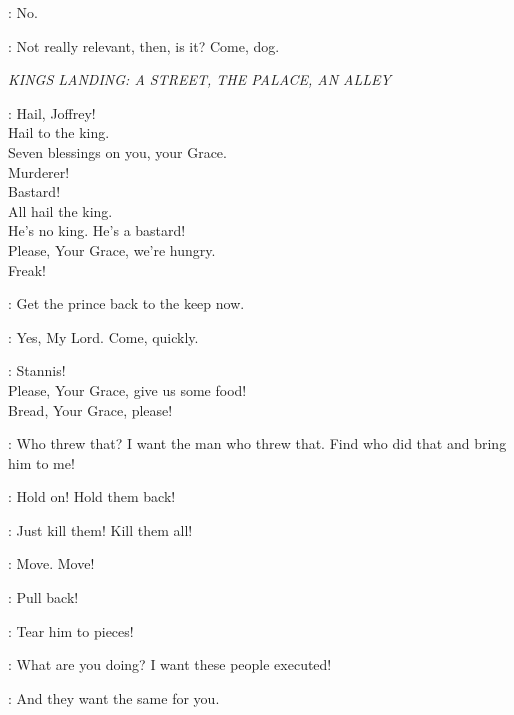 \SANSA: No. 

\JOFFREY: Not really relevant, then, is it?  Come, dog. 


\scene

\textit{KINGS LANDING: A STREET, THE PALACE, AN ALLEY} 


\CROWD: Hail, Joffrey!\\ 
Hail to the king.\\
Seven blessings on you, your Grace.\\
Murderer!\\
Bastard!\\
All hail the king.\\
He's no king. He's a bastard!\\
Please, Your Grace, we're hungry.\\
Freak!

\TYRION: Get the prince  back to the keep now. 

\LANNISTERGUARD: Yes, My Lord. Come, quickly. 

\CROWD: Stannis!\\
Please, Your Grace, give us some food!\\
Bread, Your Grace, please!


\JOFFREY: Who threw that? I want the man who threw that. Find who did that and bring him to me! 


\GUARD: Hold on! Hold them back! 

\JOFFREY: Just kill them! Kill them all! 


\TYRION: Move. Move! 

\GUARD: Pull back! 

\CROWD: Tear him to pieces!


\JOFFREY: What are you doing? I want these people executed! 

\HOUND: And they want the same for you.

